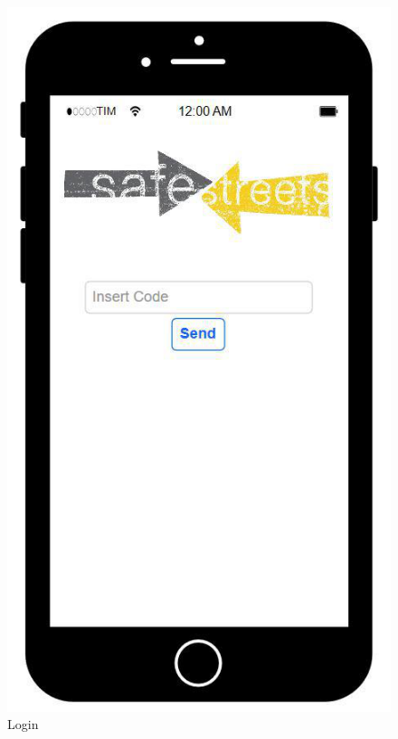 \begin{figure} [H]
    \includegraphics[scale=0.5]{Images/Templates/User/us_2.png}
    \caption{\label{fig:Mockup-1}Login}
\end{figure}

